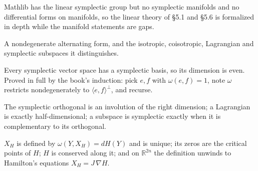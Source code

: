 Mathlib has the linear symplectic group but no symplectic manifolds and no
differential forms on manifolds, so the linear theory of \S5.1 and \S5.6 is
formalized in depth while the manifold statements are gaps.

\begin{definition}
  \label{def:5.1}
  \leanok
  A nondegenerate alternating form, and the isotropic, coisotropic, Lagrangian
  and symplectic subspaces it distinguishes.
\end{definition}

\begin{proposition}
  \label{prop:5.1.1}
  \leanok
  Every symplectic vector space has a symplectic basis, so its dimension is
  even.  Proved in full by the book's induction: pick $e,f$ with
  $\omega(e,f)=1$, note $\omega$ restricts nondegenerately to
  $\langle e,f\rangle^\perp$, and recurse.
\end{proposition}

\begin{proposition}
  \label{prop:5.1.dim}
  \leanok
  The symplectic orthogonal is an involution of the right dimension; a
  Lagrangian is exactly half-dimensional; a subspace is symplectic exactly when
  it is complementary to its orthogonal.
\end{proposition}

\begin{definition}
  \label{def:5.4}
  \leanok
  $X_H$ is defined by $\omega(Y,X_H) = dH(Y)$ and is unique; its zeros are the
  critical points of $H$; $H$ is conserved along it; and on $\mathbb{R}^{2n}$
  the definition unwinds to Hamilton's equations $X_H = J\,\nabla H$.
\end{definition}

